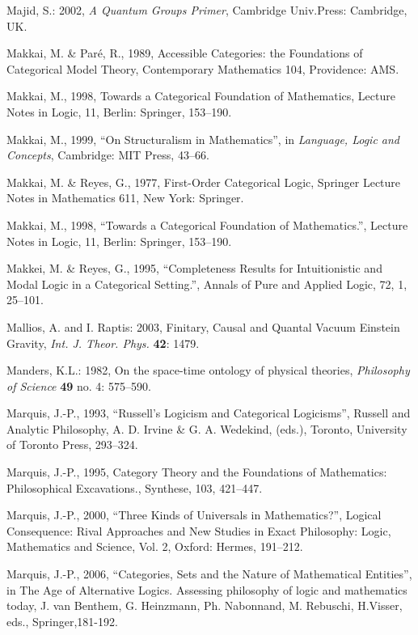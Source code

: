 \documentclass[12pt]{article}
\begin{document}
\begin{thebibliography}{399}
Majid, S.: 2002, \emph{A Quantum Groups Primer}, Cambridge Univ.Press: Cambridge, UK.

Makkai, M. \& Par\'e, R., 1989, Accessible Categories: the Foundations of Categorical Model Theory, Contemporary Mathematics 104, Providence: AMS. 

Makkai, M., 1998, Towards a Categorical Foundation of Mathematics, Lecture Notes in Logic, 11, Berlin: Springer, 153--190. 

Makkai, M., 1999, ``On Structuralism in Mathematics'', in {\em Language, Logic and Concepts}, Cambridge: MIT Press, 43--66. 

Makkai, M. \& Reyes, G., 1977, First-Order Categorical Logic, Springer Lecture Notes in Mathematics 611, New York: Springer. 

Makkai, M., 1998, ``Towards a Categorical Foundation of Mathematics.'', Lecture Notes in Logic, 11, Berlin: Springer, 153--190. 

Makkei, M. \& Reyes, G., 1995, ``Completeness Results for Intuitionistic and Modal Logic in a Categorical Setting.'', Annals of Pure and Applied Logic, 72, 1, 25--101. 

Mallios, A. and I. Raptis: 2003, Finitary, Causal and Quantal Vacuum Einstein Gravity, \emph{Int. J. Theor. Phys.} \textbf{42}: 1479.

Manders, K.L.: 1982, On the space-time ontology of physical theories, \emph{Philosophy of Science} \textbf{49} no. 4: 575--590.

Marquis, J.-P., 1993, ``Russell's Logicism and Categorical Logicisms'', Russell and Analytic Philosophy, A. D. Irvine \& G. A. Wedekind, (eds.), Toronto, University of Toronto Press, 293--324.

Marquis, J.-P., 1995, Category Theory and the Foundations of Mathematics: Philosophical Excavations., Synthese, 103, 421--447. 

Marquis, J.-P., 2000, ``Three Kinds of Universals in Mathematics?'', Logical Consequence: Rival Approaches and New Studies in Exact Philosophy: Logic, Mathematics and Science, Vol. 2, Oxford: Hermes, 191--212. 

Marquis, J.-P., 2006, ``Categories, Sets and the Nature of Mathematical Entities'', in The Age of Alternative Logics. Assessing philosophy of logic and mathematics today, J. van Benthem, G. Heinzmann, Ph. Nabonnand, M. Rebuschi, H.Visser, eds., Springer,181-192. 


\end{thebibliography}
\end{document}
